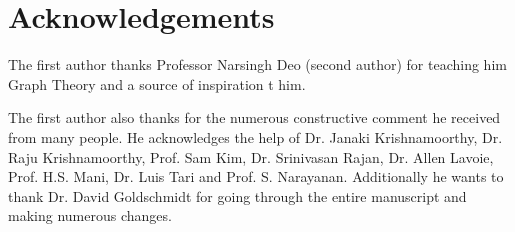 \chapter{Acknowledgements}
The first author thanks Professor Narsingh Deo (second author) for teaching him Graph Theory and a source of inspiration t him. 

The first author also thanks for the numerous constructive comment he received from many people. He acknowledges the help of Dr. Janaki Krishnamoorthy, Dr. Raju Krishnamoorthy, Prof. Sam Kim, Dr. Srinivasan Rajan, Dr. Allen Lavoie, Prof. H.S. Mani, Dr. Luis Tari and Prof. S. Narayanan. Additionally he wants to thank Dr. David Goldschmidt for going through the entire manuscript and making numerous changes.

